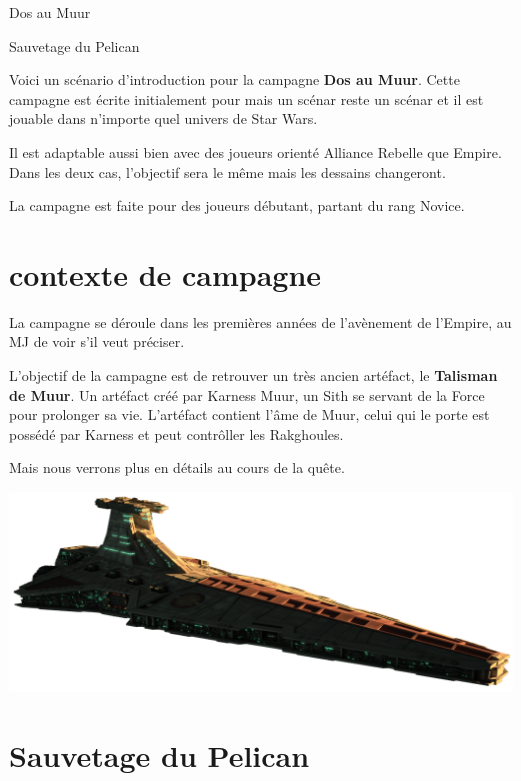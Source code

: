 \documentclass{jdrp}
\begin{document}
	\begin{titlepage}
		Dos au Muur

		Sauvetage du Pelican
	\end{titlepage}

Voici un scénario d'introduction pour la campagne \textbf{Dos au Muur}. Cette campagne est écrite initialement pour  mais un scénar reste un scénar et il est jouable dans n'importe quel univers de Star Wars.

Il est adaptable aussi bien avec des joueurs orienté Alliance Rebelle que Empire. Dans les deux cas, l'objectif sera le même mais les dessains changeront.

La campagne est faite pour des joueurs débutant, partant du rang Novice.

\section{contexte de campagne}
La campagne se déroule dans les premières années de l'avènement de l'Empire, au MJ de voir s'il veut préciser.

L'objectif de la campagne est de retrouver un très ancien artéfact, le \textbf{Talisman de Muur}. Un artéfact créé par Karness Muur, un Sith se servant de la Force pour prolonger sa vie. L'artéfact contient l'âme de Muur, celui qui le porte est possédé par Karness et peut contrôller les Rakghoules.

Mais nous verrons plus en détails au cours de la quête.

\vspace{-1\baselineskip}
\hspace{-0.4\columnsep}\includegraphics[width=\textwidth]{img/scenario/venator.png}
\vspace{-7\baselineskip}

\section{Sauvetage du Pelican}
\end{document}
